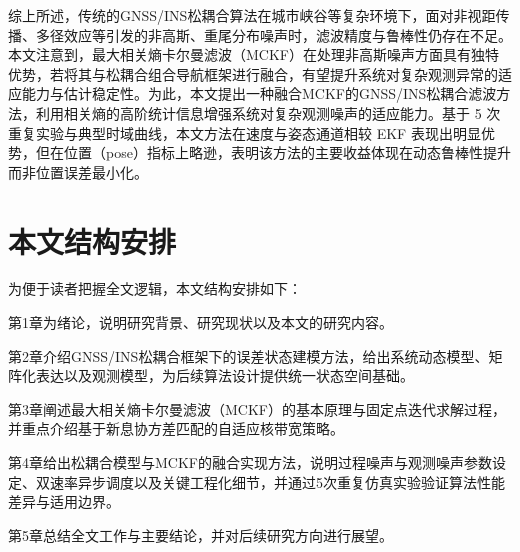 综上所述，传统的GNSS/INS松耦合算法在城市峡谷等复杂环境下，面对非视距传播、多径效应等引发的非高斯、重尾分布噪声时，滤波精度与鲁棒性仍存在不足。本文注意到，最大相关熵卡尔曼滤波（MCKF）在处理非高斯噪声方面具有独特优势，若将其与松耦合组合导航框架进行融合，有望提升系统对复杂观测异常的适应能力与估计稳定性。为此，本文提出一种融合MCKF的GNSS/INS松耦合滤波方法，利用相关熵的高阶统计信息增强系统对复杂观测噪声的适应能力。基于 5 次重复实验与典型时域曲线，本文方法在速度与姿态通道相较 EKF 表现出明显优势，但在位置（pose）指标上略逊，表明该方法的主要收益体现在动态鲁棒性提升而非位置误差最小化\cite{izanloo2016kalman,xie2025adaptive}。

\section{本文结构安排}

为便于读者把握全文逻辑，本文结构安排如下：

第1章为绪论，说明研究背景、研究现状以及本文的研究内容。

第2章介绍GNSS/INS松耦合框架下的误差状态建模方法，给出系统动态模型、矩阵化表达以及观测模型，为后续算法设计提供统一状态空间基础。

第3章阐述最大相关熵卡尔曼滤波（MCKF）的基本原理与固定点迭代求解过程，并重点介绍基于新息协方差匹配的自适应核带宽策略。

第4章给出松耦合模型与MCKF的融合实现方法，说明过程噪声与观测噪声参数设定、双速率异步调度以及关键工程化细节，并通过5次重复仿真实验验证算法性能差异与适用边界。

第5章总结全文工作与主要结论，并对后续研究方向进行展望。







